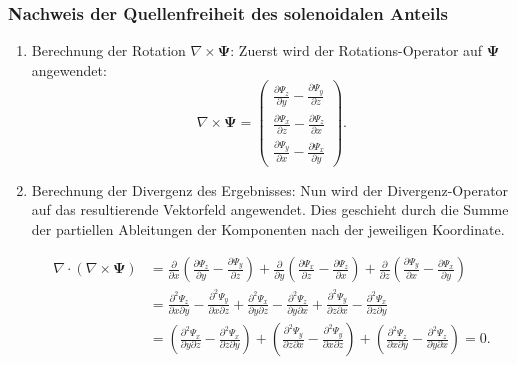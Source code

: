 \subsubsection{Nachweis der Quellenfreiheit des solenoidalen Anteils}

\begin{enumerate}
    \item Berechnung der Rotation $\nabla \times \boldsymbol{\Psi}$: Zuerst wird der Rotations-Operator auf $\boldsymbol{\Psi}$ angewendet:
    \[
    \nabla \times \boldsymbol{\Psi} =
    \begin{pmatrix}
        \frac{\partial \Psi_z}{\partial y} - \frac{\partial \Psi_y}{\partial z} \\
        \frac{\partial \Psi_x}{\partial z} - \frac{\partial \Psi_z}{\partial x} \\
        \frac{\partial \Psi_y}{\partial x} - \frac{\partial \Psi_x}{\partial y}
    \end{pmatrix}.
    \]

    \item Berechnung der Divergenz des Ergebnisses: Nun wird der Divergenz-Operator auf das resultierende Vektorfeld angewendet. Dies geschieht durch die Summe der partiellen Ableitungen der Komponenten nach der jeweiligen Koordinate.
    
    \begin{align*}
    \nabla \cdot (\nabla \times \boldsymbol{\Psi}) &= \frac{\partial}{\partial x}\left( \frac{\partial \Psi_z}{\partial y} - \frac{\partial \Psi_y}{\partial z} \right) + \frac{\partial}{\partial y}\left( \frac{\partial \Psi_x}{\partial z} - \frac{\partial \Psi_z}{\partial x} \right) + \frac{\partial}{\partial z}\left( \frac{\partial \Psi_y}{\partial x} - \frac{\partial \Psi_x}{\partial y} \right) \\[1em]
    &= \frac{\partial^2 \Psi_z}{\partial x \partial y} - \frac{\partial^2 \Psi_y}{\partial x \partial z} + \frac{\partial^2 \Psi_x}{\partial y \partial z} - \frac{\partial^2 \Psi_z}{\partial y \partial x} + \frac{\partial^2 \Psi_y}{\partial z \partial x} - \frac{\partial^2 \Psi_x}{\partial z \partial y} \\[1em]
    &= \left( \frac{\partial^2 \Psi_x}{\partial y \partial z} - \frac{\partial^2 \Psi_x}{\partial z \partial y} \right) + \left( \frac{\partial^2 \Psi_y}{\partial z \partial x} - \frac{\partial^2 \Psi_y}{\partial x \partial z} \right) + \left( \frac{\partial^2 \Psi_z}{\partial x \partial y} - \frac{\partial^2 \Psi_z}{\partial y \partial x} \right) = 0.
    \end{align*}
    

\end{enumerate}
